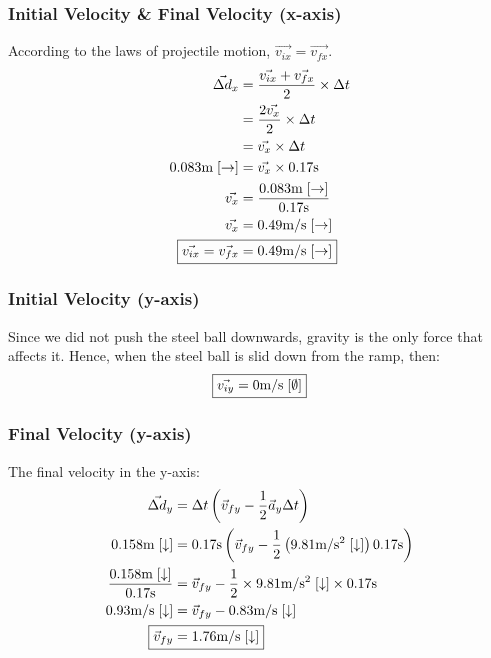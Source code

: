 \documentclass[a4paper,12pt]{article}
\begin{document}
	\subsubsection{Initial Velocity \& Final Velocity (x-axis)}
	According to the laws of projectile motion, $\vec{v_{ix}}=\vec{v_{fx}}$.
	\begin{align*}
		\vec{\Delta d}_x&=\frac{\vec{v_{ix}}+\vec{v_{fx}}}{2}\times \Delta t\\
		&=\frac{2\vec{v_x}}{2}\times \Delta t\\
		&=\vec{v_x}\times \Delta t\\
		0.083\text{m}\; [\rightarrow]&=\vec{v_x} \times 0.17\text{s}\\
		\vec{v_x}&=\frac{0.083\text{m}\; [\rightarrow]}{0.17\text{s}}\\
		\vec{v_x}&=0.49\text{m}/\text{s}\;[\rightarrow]\\
		\Aboxed{\vec{v_{ix}}=\vec{v_{fx}}&=0.49\text{m}/\text{s}\;[\rightarrow]}
	\end{align*}
	\subsubsection{Initial Velocity (y-axis)}
	Since we did not push the steel ball downwards, gravity is the only force that affects it. Hence, when the steel ball is slid down from the ramp, then:
	\begin{align*}
		\Aboxed{\vec{v_{iy}}&=0\text{m}/\text{s}\;[\emptyset]}\\
	\end{align*}
	\subsubsection{Final Velocity (y-axis)}
	The final velocity in the y-axis:
	\begin{align*}
		\vec{\Delta d}_y&=\Delta t\left(\vec{v}_{fy}-\frac{1}{2}\vec{a}_y\Delta t\right)\\
		0.158\text{m}\;[\downarrow]&=0.17\text{s}\left(\vec{v}_{fy}-\frac{1}{2}\left(9.81\text{m}/\text{s}^2\;[\downarrow]\right)0.17\text{s}\right)\\
		\frac{0.158\text{m}\;[\downarrow]}{0.17\text{s}}&=\vec{v}_{fy}-\frac{1}{2}\times9.81\text{m}/\text{s}^2\;[\downarrow]\times0.17\text{s}\\
		0.93\text{m}/\text{s}\;[\downarrow]&=\vec{v}_{fy}-0.83\text{m}/\text{s}\;[\downarrow]\\
		\Aboxed{\vec{v}_{fy}&=1.76\text{m}/\text{s}\;[\downarrow]}
	\end{align*}
\end{document}
